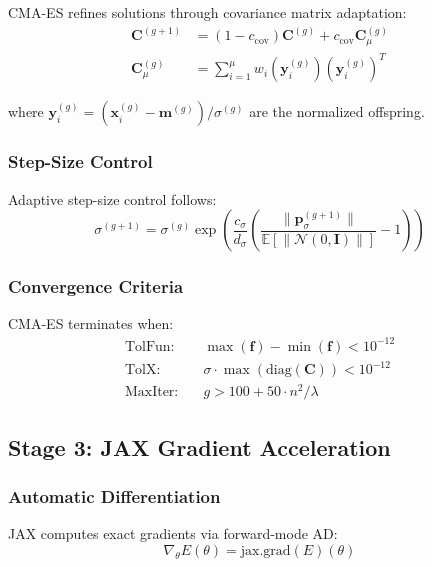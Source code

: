 CMA-ES refines solutions through covariance matrix adaptation:
\begin{align}
\mathbf{C}^{(g+1)} &= (1-c_{\text{cov}})\mathbf{C}^{(g)} + c_{\text{cov}}\mathbf{C}_{\mu}^{(g)} \\
\mathbf{C}_{\mu}^{(g)} &= \sum_{i=1}^{\mu} w_i (\mathbf{y}_i^{(g)})(\mathbf{y}_i^{(g)})^T
\end{align}

where $\mathbf{y}_i^{(g)} = (\mathbf{x}_i^{(g)} - \mathbf{m}^{(g)})/\sigma^{(g)}$ are the normalized offspring.

\subsubsection{Step-Size Control}

Adaptive step-size control follows:
\begin{equation}
\sigma^{(g+1)} = \sigma^{(g)} \exp\left(\frac{c_{\sigma}}{d_{\sigma}}\left(\frac{\|\mathbf{p}_{\sigma}^{(g+1)}\|}{\mathbb{E}[\|\mathcal{N}(0,\mathbf{I})\|]} - 1\right)\right)
\end{equation}

\subsubsection{Convergence Criteria}

CMA-ES terminates when:
\begin{align}
\text{TolFun:} \quad &\max(\mathbf{f}) - \min(\mathbf{f}) < 10^{-12} \\
\text{TolX:} \quad &\sigma \cdot \max(\text{diag}(\mathbf{C})) < 10^{-12} \\
\text{MaxIter:} \quad &g > 100 + 50 \cdot n^2/\lambda
\end{align}

\subsection{Stage 3: JAX Gradient Acceleration}

\subsubsection{Automatic Differentiation}

JAX computes exact gradients via forward-mode AD:
\begin{equation}
\nabla_{\theta} E(\theta) = \text{jax.grad}(E)(\theta)
\end{equation}

